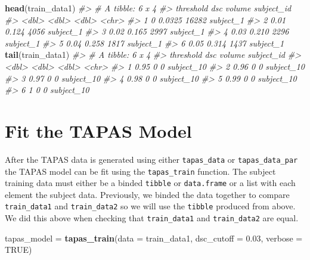 \documentclass[]{article}
\newenvironment{Shaded}{\begin{snugshade}}{\end{snugshade}}
\newcommand{\CommentTok}[1]{\textcolor[rgb]{0.56,0.35,0.01}{\textit{#1}}}
\newcommand{\DataTypeTok}[1]{\textcolor[rgb]{0.13,0.29,0.53}{#1}}
\newcommand{\FloatTok}[1]{\textcolor[rgb]{0.00,0.00,0.81}{#1}}
\newcommand{\KeywordTok}[1]{\textcolor[rgb]{0.13,0.29,0.53}{\textbf{#1}}}
\newcommand{\NormalTok}[1]{#1}
\newcommand{\OtherTok}[1]{\textcolor[rgb]{0.56,0.35,0.01}{#1}}
\newcommand{\StringTok}[1]{\textcolor[rgb]{0.31,0.60,0.02}{#1}}
\begin{document}
\begin{Shaded}
\begin{Highlighting}[]
\KeywordTok{head}\NormalTok{(train_data1)}
\CommentTok{#> # A tibble: 6 x 4}
\CommentTok{#>   threshold    dsc volume subject_id}
\CommentTok{#>       <dbl>  <dbl>  <dbl> <chr>     }
\CommentTok{#> 1      0    0.0325  16282 subject_1 }
\CommentTok{#> 2      0.01 0.124    4056 subject_1 }
\CommentTok{#> 3      0.02 0.165    2997 subject_1 }
\CommentTok{#> 4      0.03 0.210    2296 subject_1 }
\CommentTok{#> 5      0.04 0.258    1817 subject_1 }
\CommentTok{#> 6      0.05 0.314    1437 subject_1}
\KeywordTok{tail}\NormalTok{(train_data1)}
\CommentTok{#> # A tibble: 6 x 4}
\CommentTok{#>   threshold   dsc volume subject_id}
\CommentTok{#>       <dbl> <dbl>  <dbl> <chr>     }
\CommentTok{#> 1      0.95     0      0 subject_10}
\CommentTok{#> 2      0.96     0      0 subject_10}
\CommentTok{#> 3      0.97     0      0 subject_10}
\CommentTok{#> 4      0.98     0      0 subject_10}
\CommentTok{#> 5      0.99     0      0 subject_10}
\CommentTok{#> 6      1        0      0 subject_10}
\end{Highlighting}
\end{Shaded}

\hypertarget{fit-the-tapas-model}{%
\section{Fit the TAPAS Model}\label{fit-the-tapas-model}}

After the TAPAS data is generated using either \texttt{tapas\_data} or
\texttt{tapas\_data\_par} the TAPAS model can be fit using the
\texttt{tapas\_train} function. The subject training data must either be
a binded \texttt{tibble} or \texttt{data.frame} or a list with each
element the subject data. Previously, we binded the data together to
compare \texttt{train\_data1} and \texttt{train\_data2} so we will use
the \texttt{tibble} produced from above. We did this above when checking
that \texttt{train\_data1} and \texttt{train\_data2} are equal.

\begin{Shaded}
\begin{Highlighting}[]
\NormalTok{tapas_model =}\StringTok{ }\KeywordTok{tapas_train}\NormalTok{(}\DataTypeTok{data =}\NormalTok{ train_data1, }
                          \DataTypeTok{dsc_cutoff =} \FloatTok{0.03}\NormalTok{, }
                          \DataTypeTok{verbose =} \OtherTok{TRUE}\NormalTok{)}
\end{Highlighting}
\end{Shaded}
\end{document}
